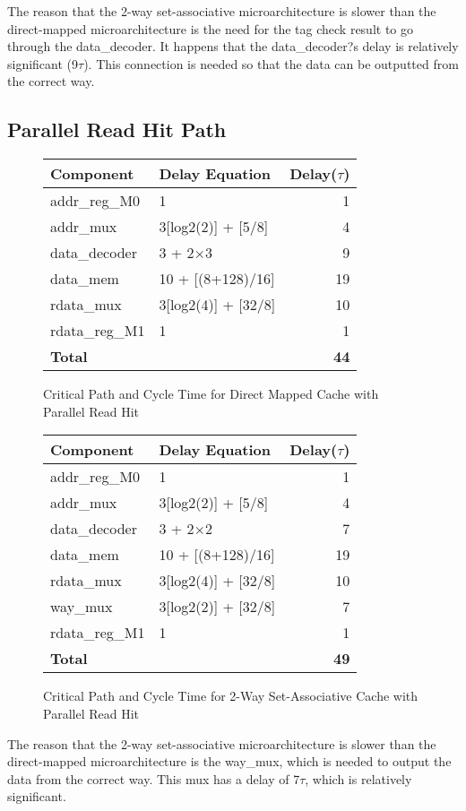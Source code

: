 \documentclass[10pt]{article}
\begin{document}
The reason that the 2-way set-associative microarchitecture is slower than the direct-mapped microarchitecture is the need for the tag check result to go through the data\_decoder. It happens that the data\_decoder?s delay is relatively significant (9$\tau$). This connection is needed so that the data can be outputted from the correct way. 

\subsection{Parallel Read Hit Path}
\begin{figure}[H]
\centering
\begin{tabular}{@{\extracolsep{3pt}}llr@{}}
\hline
\textbf{Component} & \textbf{Delay Equation} & \textbf{Delay($\tau$)} \\
\hline
addr\_reg\_M0 & 1 & 1 \\
addr\_mux	& 3[log2(2)] + [5/8] & 4 \\
data\_decoder& 3 + 2$\times$3 & 9 \\
data\_mem	& 10 + [(8+128)/16] & 19 \\
rdata\_mux	& 3[log2(4)] + [32/8] & 10 \\
rdata\_reg\_M1& 1 & 1 \\
\hline
\textbf{Total} & & \textbf{44} \\
\hline
\end{tabular}
\caption{Critical Path and Cycle Time for Direct Mapped Cache with
\\ Parallel Read Hit}
\end{figure}
\begin{figure}[H]
\centering
\begin{tabular}{@{\extracolsep{3pt}}llr@{}}
\hline
\textbf{Component} & \textbf{Delay Equation} & \textbf{Delay($\tau$)} \\
\hline
addr\_reg\_M0 & 1 & 1 \\
addr\_mux	& 3[log2(2)] + [5/8] & 4 \\
data\_decoder& 3 + 2$\times$2 & 7 \\
data\_mem	& 10 + [(8+128)/16] & 19 \\
rdata\_mux	& 3[log2(4)] + [32/8] & 10 \\
way\_mux		& 3[log2(2)] + [32/8] & 7 \\
rdata\_reg\_M1& 1 & 1 \\
\hline
\textbf{Total} & & \textbf{49} \\
\hline
\end{tabular}
\caption{Critical Path and Cycle Time for 2-Way Set-Associative Cache with
\\ Parallel Read Hit}
\end{figure}
The reason that the 2-way set-associative microarchitecture is slower than the direct-mapped microarchitecture is the way\_mux, which is needed to output the data from the correct way. This mux has a delay of 7$\tau$, which is relatively significant. 
\end{document}
